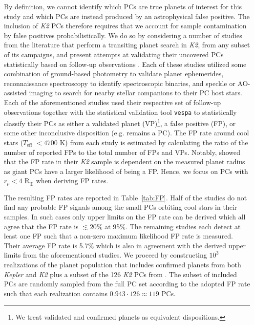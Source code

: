 \documentclass[twocolumn]{emulateapj}
\newcommand{\kepler}[1]{\emph{Kepler}#1}
\newcommand{\ktwo}[1]{\emph{K2}#1}
\newcommand{\teff}[1]{$T_{\text{eff}}$#1}
\begin{document}
By definition, we cannot identify which PCs are true planets of interest for this study and
which PCs are instead produced by an astrophysical false positive. 
The inclusion of \ktwo{} PCs therefore requires that we account for sample contamination by false positives
probabilistically. We do so by considering
a number of studies from the literature that perform a transiting planet search in \ktwo{,} from any subset of its campaigns,
and present attempts at validating their uncovered PCs statistically based on follow-up observations
\citep{montet15,crossfield16b,dressing17,hirano18,livingston18a,mayo18}. Each of these studies utilized some combination of
ground-based photometry to validate planet ephemerides, reconnaissance
spectroscopy to identify spectroscopic binaries, and speckle or AO-assisted imaging to search for nearby stellar companions to
their PC host stars. Each of the aforementioned studies used their respective set of follow-up observations together with the
statistical validation tool \texttt{vespa} \citep{morton12,morton15} to statistically classify their PCs as either a validated
planet (VP)\footnote{We treat validated and confirmed planets as equivalent dispositions.},
a false positive (FP), or some other inconclusive disposition (e.g. remains a PC). The FP rate around cool
stars (\teff{} $< 4700$ K) from each study is estimated by calculating the ratio of the number of reported FPs to
the total number of FPs and VPs. Notably, \cite{crossfield16b} showed that the FP rate in their \ktwo{} sample is dependent
on the measured planet radius as giant PCs have a larger likelihood of
being a FP. Hence, we focus on PCs with $r_p<4$ R$_{\oplus}$ when deriving FP rates.

The resulting FP rates are reported in Table~\ref{tab:FP}. Half of the studies do not find any probable
FP signals among the small PCs orbiting cool stars in their samples. In such cases only upper limits on the FP rate
can be derived which all agree that the FP rate is $\lesssim 20$\% at 95\%. The remaining studies
each detect at least one FP such that a non-zero maximum likelihood FP rate is measured. Their average FP rate is 5.7\%
which is also in agreement with the derived upper limits from the aforementioned studies.
We proceed by constructing $10^3$ realizations of the planet population
that includes confirmed planets from both \kepler{} and \ktwo{} plus a subset of the 126 \ktwo{} PCs from
\cite{kruse19}. The subset of included PCs are randomly sampled from the full PC set
according to the adopted FP rate such that each realization contains $0.943\cdot 126 \approx 119$ PCs.
\end{document}
